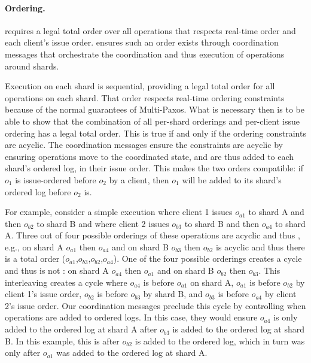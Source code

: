 \paragraph{\Mdl{} Ordering.}
\Mdl{} requires a legal total order over all operations that respects real-time order and each client's issue order.
\sys{} ensures such an order exists through coordination messages that orchestrate the coordination and thus execution of operations around shards.

Execution on each shard is sequential, providing a legal total order for all operations on each shard.
That order respects real-time ordering constraints because of the normal guarantees of Multi-Paxos.
What is necessary then is to be able to show that the combination of all per-shard orderings and per-client issue ordering has a legal total order.
This is true if and only if the ordering constraints are acyclic.
The coordination messages ensure the constraints are acyclic by ensuring operations move to the coordinated state, and are thus added to each shard's ordered log, in their issue order.
This makes the two orders compatible: if $o_1$ is issue-ordered before $o_2$ by a client, then $o_1$ will be added to its shard's ordered log before $o_2$ is.

For example, consider a simple execution where client 1 issues $o_{a1}$ to shard A and then $o_{b2}$ to shard B and where client 2 issues $o_{b3}$ to shard B and then $o_{a4}$ to shard A.
Three out of four possible orderings of these operations are acyclic and thus \mdl{},
e.g., on shard A $o_{a1}$ then $o_{a4}$ and on shard B $o_{b3}$ then $o_{b2}$ is acyclic and thus there is a total order ($o_{a1}$,$o_{b3}$,$o_{b2}$,$o_{a4}$).
One of the four possible orderings creates a cycle and thus is not \mdl{}:
on shard A $o_{a4}$ then $o_{a1}$ and on shard B $o_{b2}$ then $o_{b3}$.
This interleaving creates a cycle where $o_{a4}$ is before $o_{a1}$ on shard A, $o_{a1}$ is before $o_{b2}$ by client 1's issue order, $o_{b2}$ is before $o_{b3}$ by shard B, and $o_{b3}$ is before $o_{a4}$ by client 2's issue order.
Our coordination messages preclude this cycle by controlling when operations are added to ordered logs.
In this case, they would ensure $o_{a4}$ is only added to the ordered log at shard A after $o_{b3}$ is added to the ordered log at shard B. In this example, this is after $o_{b2}$ is added to the ordered log, which in turn was only after $o_{a1}$ was added to the ordered log at shard A.

